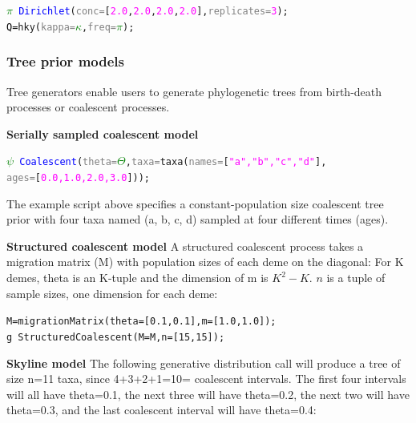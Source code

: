 \documentclass[10pt,letterpaper,table]{article}
\begin{document}
{\small
\begin{alltt}
    \textcolor{green}{\(\pi\)} ~ \textcolor{blue}{Dirichlet}(\textcolor{gray}{conc=}[\textcolor{magenta}{2.0}, \textcolor{magenta}{2.0}, \textcolor{magenta}{2.0}, \textcolor{magenta}{2.0}], \textcolor{gray}{replicates=}\textcolor{magenta}{3});
    \textcolor{black}{Q = }\textcolor{magenta!80!black}{hky}(\textcolor{gray}{kappa=}\textcolor{green}{\(\kappa\)}, \textcolor{gray}{freq=}\textcolor{green}{\(\pi\)});
\end{alltt} 


\subsubsection{Tree prior models}
\label{sec:treeprior}
Tree generators enable users to generate phylogenetic trees from birth-death processes or coalescent processes. 
\newline

\noindent{} \textbf{Serially sampled coalescent model}
{\small
  \begin{alltt}
    \textcolor{green}{\(\psi\)} ~ \textcolor{blue}{Coalescent}(\textcolor{gray}{theta=}\textcolor{green}{\(\Theta\)}, \textcolor{gray}{taxa=}\textcolor{magenta!80!black}{taxa}(\textcolor{gray}{names=}[\textcolor{magenta}{"a", "b", "c", "d"}], \\  \textcolor{gray}{ages=}[\textcolor{magenta}{0.0, 1.0, 2.0, 3.0}]));
  \end{alltt}
}
\noindent{} The example script above specifies a
constant-population size coalescent tree prior \cite{Rodrigo1999SerialCoalescent} with four taxa named (a, b, c, d) 
sampled at four different times (ages).
\newline 

\noindent{} \textbf{Structured coalescent model}
\newline
A structured coalescent process takes a migration matrix (M) with
population sizes of each deme on the diagonal:
For K demes, theta is an K-tuple and the dimension of m is $K^2 -
K$. $n$ is a tuple of sample sizes, one dimension for each deme:

{\small
  \begin{alltt}
    M = migrationMatrix(theta=[0.1, 0.1], m=[1.0, 1.0]);
    g ~ StructuredCoalescent(M=M, n=[15, 15]);
  \end{alltt}
}

\noindent{} \textbf{Skyline model}
\newline
The following generative distribution call will produce a tree of size
n=11 taxa, since 4+3+2+1=10= coalescent intervals.
The first four intervals will all have theta=0.1, the next three will
have theta=0.2, the next two will have theta=0.3, and the last
coalescent interval will have theta=0.4:

}
\end{document}
